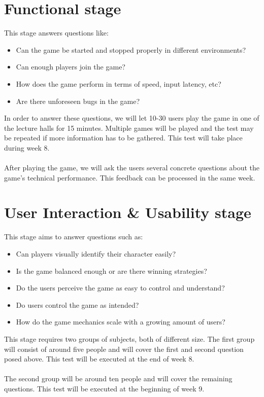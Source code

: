 \documentclass[11pt,a4paper]{article}
\begin{document}
\section{Functional stage}
This stage answers questions like:
\begin{itemize}
\item Can the game be started and stopped properly in different environments?
\item Can enough players join the game?
\item How does the game perform in terms of speed, input latency, etc?
\item Are there unforeseen bugs in the game?
\end{itemize}
In order to answer these questions, we will let 10-30 users play the game in one of the lecture halls for 15 minutes. Multiple games will be played and the test may be repeated if more information has to be gathered. This test will take place during week 8.\\
\\
After playing the game, we will ask the users several concrete questions about the game's technical performance. This feedback can be processed in the same week.

\section{User Interaction \& Usability stage}
This stage aims to answer questions such as:
\begin{itemize}
\item Can players visually identify their character easily?
\item Is the game balanced enough or are there winning strategies?
\item Do the users perceive the game as easy to control and understand?
\item Do users control the game as intended?
\item How do the game mechanics scale with a growing amount of users?
\end{itemize}
This stage requires two groups of subjects, both of different size. The first group will consist of around five people and will cover the first and second question posed above. This test will be executed at the end of week 8.\\
\\
The second group will be around ten people and will cover the remaining questions. This test will be executed at the beginning of week 9.
\end{document}
